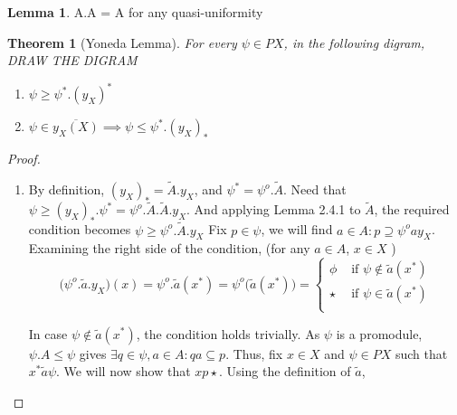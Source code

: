 \documentclass[18pt,a4paper]{article}
\newtheorem{theorem}{Theorem}[section]
\theoremstyle{definition}
\newtheorem{lemma}{Lemma}[definition]
\begin{document}
\begin{lemma}
	A.A = A for any quasi-uniformity
\end{lemma}

\begin{theorem}[Yoneda Lemma] %
For every $\psi \in PX$, in the following digram, DRAW THE DIGRAM
	\begin{enumerate}[label=(\alph*)]
		\item $\psi \geq \psi^*.(y_X)^*$
		\item $\psi \in \overline{y_X(X)} \implies \psi \leq \psi^*.(y_X)_*$
	\end{enumerate}
\end{theorem}

\begin{proof}
\begin{enumerate}[label=(\alph*)]
	\item By definition, $(y_X)_*=\tilde{A}.y_X$, and $\psi^*=\psi^o.\tilde{A}$. Need that
		$\psi \geq (y_X)_*.\psi^* = \psi^o.\tilde{A}.\tilde{A}.y_X$. And applying Lemma 2.4.1 to
		$\tilde{A}$, the required condition becomes $\psi \geq \psi^o .\tilde{A} .y_X$
		Fix $p \in \psi$,
		we will find $a \in A: p \supseteq \psi^o a y_X$. Examining the right side of the condition,
		(for any $a \in A$, $x \in X$  )
		\begin{equation} \Big(\psi^o.\tilde{a} .y_X \Big) (x) = \psi^o.\tilde{a} (x^*)=
		\psi^o\big(\tilde{a}(x^*)\big)= \begin{cases}
			\phi &\text{ if } \psi \notin \tilde{a} (x^*) \\
			\star &\text{ if } \psi \in \tilde{a} (x^*) \\

		\end{cases}\end{equation}

		In case $\psi \notin \tilde{a} (x^*)$, the condition holds trivially. As $\psi$ is a
		promodule, $\psi.A\leq \psi$ gives $\exists q\in \psi, a
		\in A: qa \subseteq p$. Thus, fix $x\in X$ and	$\psi \in PX$ such that
		$x^* \tilde{a} \psi $. We will now show that $xp\star$. Using the definition of $\tilde{a}$,


\end{enumerate}
\end{proof}
\end{document}
